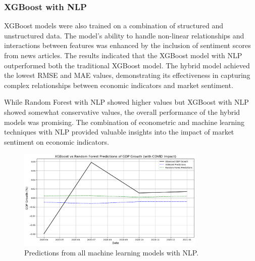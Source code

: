 \subsubsection{XGBoost with NLP}
\label{subsubsec:xgboost_nlp}
XGBoost models were also trained on a combination of structured and unstructured data. The model's ability to handle non-linear relationships and interactions between features was enhanced by the inclusion of sentiment scores from news articles.
The results indicated that the XGBoost model with NLP outperformed both the traditional XGBoost model. The hybrid model achieved the lowest RMSE and MAE values, demonstrating its effectiveness in capturing complex relationships between economic indicators and market sentiment.

While Random Forest with NLP showed higher values but XGBoost with NLP showed somewhat conservative values, the overall performance of the hybrid models was promising. The combination of econometric and machine learning techniques with NLP provided valuable insights into the impact of market sentiment on economic indicators.

\begin{figure}[ht]
    \centering
    \includegraphics[width=0.8\textwidth]{../images/bert_xg_vs_rf.png}
    \caption{Predictions from all machine learning models with NLP.}
    \label{fig:all-ml-models-nlp}
\end{figure}